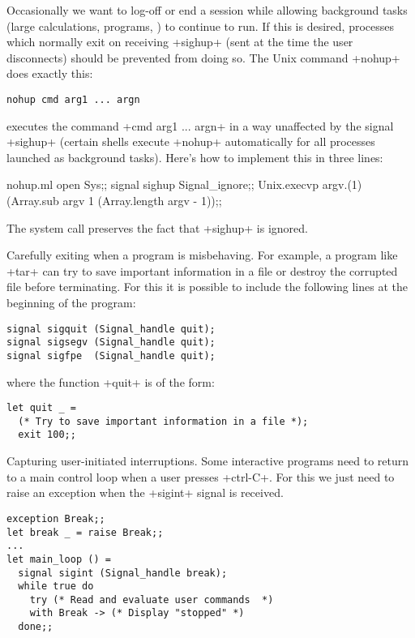 \begin{example}
Occasionally we want to log-off or end a session while allowing 
background tasks (large calculations,  programs, \etc) 
to continue to run.  If this is desired, processes which normally
exit on receiving \ml+sighup+ (sent at the time the user disconnects)
should be prevented from doing so. The Unix command \ml+nohup+ does
exactly this:
\begin{lstlisting}
nohup cmd arg1 ... argn
\end{lstlisting}
executes the command \ml+cmd arg1 ... argn+ in a way unaffected by
the signal \ml+sighup+ (certain shells execute \ml+nohup+
automatically for all processes launched as background tasks).  Here's how
to implement this in three lines:
%
\begin{listingcodefile}{nohup.ml}
open Sys;;
signal sighup Signal_ignore;;
Unix.execvp argv.(1) (Array.sub argv 1 (Array.length argv - 1));;
\end{listingcodefile}
%
The system call  preserves the fact that
\ml+sighup+ is ignored.
\end{example}

\begin{example} 
Carefully exiting when a program is misbehaving. For example,
a program like \ml+tar+ can try to save important information
in a file or destroy the corrupted file before terminating.  For this 
it is possible to include the following lines at the beginning of the program:
%
\begin{lstlisting}
signal sigquit (Signal_handle quit);
signal sigsegv (Signal_handle quit);
signal sigfpe  (Signal_handle quit);
\end{lstlisting}
%
where the function \ml+quit+ is of the form:
%
\begin{lstlisting}
let quit _ =
  (* Try to save important information in a file *);
  exit 100;;
\end{lstlisting}
\end{example}

\begin{example} 
Capturing user-initiated interruptions. Some interactive programs
need to return to a main control loop when a user
presses \ml+ctrl-C+.  For this we just need to raise an exception when the
\ml+sigint+ signal is received.
%
\begin{lstlisting}
exception Break;;
let break _ = raise Break;;
...
let main_loop () =
  signal sigint (Signal_handle break);
  while true do
    try (* Read and evaluate user commands  *)
    with Break -> (* Display "stopped" *)
  done;;
\end{lstlisting}
\end{example}

